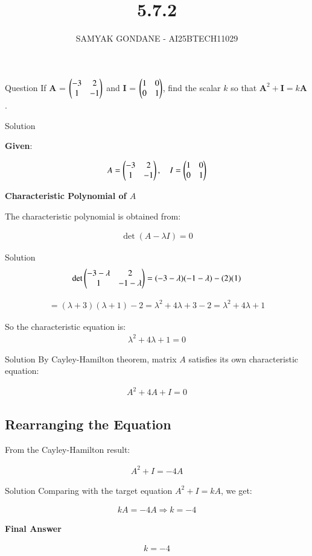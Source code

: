 \documentclass{beamer}
\title 
{5.7.2}
\date{}
\author
{SAMYAK GONDANE - AI25BTECH11029}
\begin{document}
\frame{\titlepage}

\begin{frame}{Question}
If $\textbf{A}$ = $\begin{pmatrix}-3 & 2 \\ 1 & -1\end{pmatrix}$ and $\textbf{I}$ = $\begin{pmatrix}1 & 0 \\ 0 & 1\end{pmatrix}$, find the scalar $k$ so that $\textbf{A}^2 + \textbf{I} = k\textbf{A}$.
\end{frame}

\begin{frame}{Solution}

\textbf{Given}:

\begin{align}
A = \begin{pmatrix}-3 & 2 \\ 1 & -1\end{pmatrix}, \quad
I = \begin{pmatrix}1 & 0 \\ 0 & 1\end{pmatrix}
\end{align}


\textbf{Characteristic Polynomial of $A$}

The characteristic polynomial is obtained from:

\begin{align}
\det(A - \lambda I) = 0
\end{align}
\end{frame}

\begin{frame}{Solution}
\begin{align}
\det\begin{pmatrix}-3 - \lambda & 2 \\ 1 & -1 - \lambda\end{pmatrix}
= (-3 - \lambda)(-1 - \lambda) - (2)(1)
\end{align}

\begin{align}
= (\lambda + 3)(\lambda + 1) - 2 = \lambda^2 + 4\lambda + 3 - 2 = \lambda^2 + 4\lambda + 1
\end{align}

So the characteristic equation is:
\begin{align}
\lambda^2 + 4\lambda + 1 = 0
\end{align}
\end{frame}


\begin{frame}{Solution}
By Cayley-Hamilton theorem, matrix $A$ satisfies its own characteristic equation:

\begin{align}
A^2 + 4A + I = 0
\end{align}


\subsection*{Rearranging the Equation}

From the Cayley-Hamilton result:

\begin{align}
A^2 + I = -4A
\end{align}
\end{frame}

\begin{frame}{Solution}
Comparing with the target equation $A^2 + I = kA$, we get:

\begin{align}
kA = -4A \Rightarrow \boxed{k = -4}
\end{align}


\textbf{Final Answer}

\begin{align}
\boxed{k = -4}
\end{align}


\end{frame}
\end{document}
